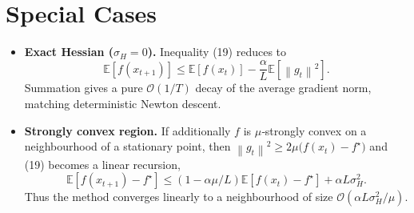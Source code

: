 \documentclass{article}
\newcommand{\E}{\mathbb{E}}
\newcommand{\norm}[1]{\left\|#1\right\|}
\begin{document}
\section*{Special Cases}
\begin{itemize}
\item \textbf{Exact Hessian ($\sigma_H=0$).}  Inequality (19) reduces to
\[
\E[f(x_{t+1})]\le \E[f(x_t)]-\frac{\alpha}{L}\E[\norm{g_t}^2] .
\]
Summation gives a pure $\mathcal O(1/T)$ decay of the average gradient norm, matching deterministic Newton descent.
\item \textbf{Strongly convex region.}  If additionally $f$ is $\mu$‑strongly convex on a neighbourhood of a stationary point, then $\norm{g_t}^2\ge 2\mu\big(f(x_t)-f^\star\big)$ and (19) becomes a linear recursion,
\[
\E[f(x_{t+1})-f^\star]\le (1-\alpha\mu/L)\E[f(x_t)-f^\star]+\alpha L\sigma_H^2 .
\]
Thus the method converges linearly to a neighbourhood of size $\mathcal O(\alpha L\sigma_H^2/\mu)$.
\end{itemize}
\end{document}
